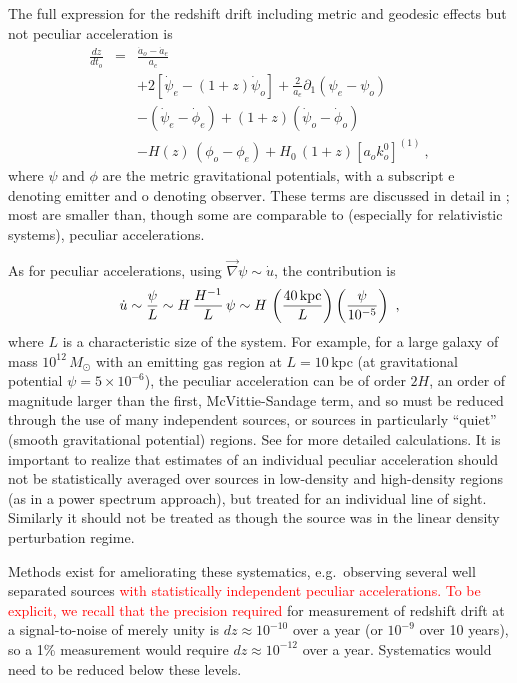\documentclass[preprint2, 10pt]{aastex}
\newcommand{\be}{\begin{equation}}
\newcommand{\ee}{\end{equation}}
\newcommand{\bea}{\begin{eqnarray}}
\newcommand{\eea}{\end{eqnarray}}
\begin{document}
The full expression for the redshift drift including metric and geodesic 
effects but not peculiar acceleration is 
\bea 
\frac{dz}{dt_o}&=&\frac{\dot a_o-\dot a_e}{a_e}\\ 
&&+2[\dot\psi_e-(1+z)\dot\psi_o]
+\frac{2}{a_e}\partial_1(\psi_e-\psi_o)\nonumber\\ 
&&-(\dot\psi_e-\dot\phi_e)+(1+z)(\dot\psi_o-\dot\phi_o)\nonumber\\ 
&&-H(z)\,(\phi_o-\phi_e)+H_0\,(1+z)[a_o k^0_o]^{(1)}\ ,\nonumber  
\eea 
where $\psi$ and $\phi$ are the metric gravitational potentials, 
with a subscript e denoting emitter and o denoting observer. 
These terms are discussed in detail in \citet{10044646}; most are smaller 
than, though some are comparable to (especially for relativistic systems), 
peculiar accelerations. 

As for peculiar accelerations, using 
$\vec\nabla\psi\sim \dot u$, the contribution is 
\be 
\dot u \sim \frac{\psi}{L}\sim H\,\frac{H^{-1}}{L}\,\psi\sim H\, 
\left(\frac{40\,{\rm kpc}}{L}\right)\left(\frac{\psi}{10^{-5}}\right)\ , 
\ee 
where $L$ is a characteristic size of the system. 
For example, for a 
large galaxy of mass $10^{12}\,M_\odot$ with an emitting gas 
region at $L=10\,$kpc (at gravitational potential $\psi=5\times 10^{-6}$), 
the peculiar acceleration can be of order $2H$, an order of magnitude 
larger than the first, McVittie-Sandage term, and so must be reduced through 
the use of many independent sources, or sources in particularly ``quiet'' 
(smooth gravitational potential) regions.
See \citet{2008PhLB..660...81A,2008PhRvD..77b1301U} for 
more detailed calculations. It is important to realize that estimates of 
an individual peculiar acceleration should not be statistically averaged 
over sources in 
low-density and high-density regions (as in a power spectrum approach), 
but treated for an individual line of sight. 
Similarly it should not be treated as though the source was in the linear 
density perturbation regime. 

Methods exist for ameliorating these systematics, e.g.\ observing several 
well separated sources 
\textcolor{red}{with statistically independent peculiar accelerations. 
To be explicit, 
we recall that the precision required} for measurement of 
redshift drift at a signal-to-noise of merely unity is 
$dz\approx 10^{-10}$ over a year (or $10^{-9}$ over 10 years), 
so a 1\% measurement would require $dz\approx 10^{-12}$ over a year.  
Systematics would need to be reduced below these levels. 
\end{document}
